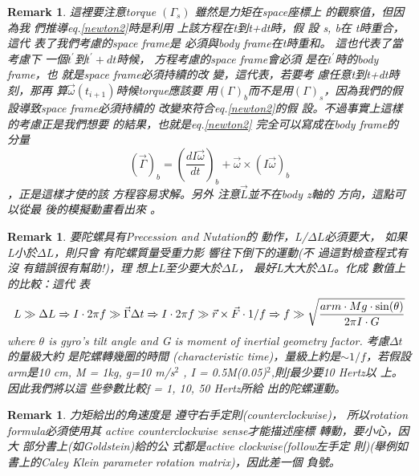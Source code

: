 \documentclass[12pt,a4paper]{article}
\newtheorem{remark}[theorem]{Remark}
\begin{document}
\begin{remark}
這裡要注意torque $\left( \Gamma _{s}\right) $%
雖然是力矩在space座標上%
的觀察值，但因為我%
們推導eq.\ref{newton2}時是利用%
上該方程在t到t+dt時，假%
設 s, b在 t時重合，這代%
表了我們考慮的space frame是%
必須與body frame在t時重和。%
這也代表了當考慮下%
一個$t^{\prime }$到$t^{\prime }+dt$時候，%
方程考慮的space frame會必須%
是在$t^{\prime }$時的body frame，也%
就是space frame必須持續的改%
變，這代表，若要考%
慮任意t到t+dt時刻，那再%
算$\vec{\omega}(t_{i+1})$時候torque應該要%
用$\left( \Gamma \right) _{b}$而不是用$\left(
\Gamma \right) _{s}$，因為我們的假%
設導致space frame必須持續的%
改變來符合eq.\ref{newton2}的假%
設。不過事實上這樣%
的考慮正是我們想要%
的結果，也就是eq.\ref{newton2}%
完全可以寫成在body frame的%
分量%
\begin{equation}
\left( \vec{\Gamma}\right) _{b}=\left( \frac{dI\vec{\omega}}{dt}\right) _{b}+%
\vec{\omega}\times \left( I\vec{\omega}\right) _{b}
\end{equation}%
，正是這樣才使的該%
方程容易求解。另外%
注意$\vec{L}$並不在body z軸的%
方向，這點可以從最%
後的模擬動畫看出來%
。
\end{remark}

\begin{remark}
要陀螺具有Precession and Nutation的%
動作，L/$\Delta L$必須要大，%
如果L小於$\Delta L$，則只會%
有陀螺質量受重力影%
響往下倒下的運動(不%
過這對檢查程式有沒%
有錯誤很有幫助!)，理%
想上L至少要大於$\Delta L$，%
最好L大大於$\Delta L$。化成%
數值上的比較：這代%
表%
\begin{equation}
L\gg \Delta L\Rightarrow I\cdot 2\pi f\gg \vec{\Gamma}\Delta t\Rightarrow
I\cdot 2\pi f\gg \vec{r}\times \vec{F}\cdot 1/f\Rightarrow f\gg \sqrt{\frac{%
arm\cdot Mg\cdot \sin (\theta )}{2\pi I\cdot G}}
\end{equation}%
where $\theta $ is gyro's tilt angle and G is moment of inertial geometry
factor. 考慮$\Delta t$的量級大約%
是陀螺轉幾圈的時間%
(characteristic time)，量級上約是$\sim
1/f$，若假設arm是10 cm, M = 1kg, g=10 m/s$^{2}$%
, I = 0.5M(0.05)$^{2}$,則f最少要10 Hertz以%
上。因此我們將以這%
些參數比較f = 1, 10, 50 Hertz所給%
出的陀螺運動。
\end{remark}

\begin{remark}
力矩給出的角速度是%
遵守右手定則(counterclockwise)，%
所以rotation formula必須使用其%
active counterclockwise sense才能描述座標%
轉動，要小心，因大%
部分書上(如Goldstein)給的公%
式都是active clockwise(follow左手定%
則)(舉例如書上的Caley Klein
parameter rotation matrix)，因此差一個%
負號。\bigskip
\end{remark}
\end{document}
